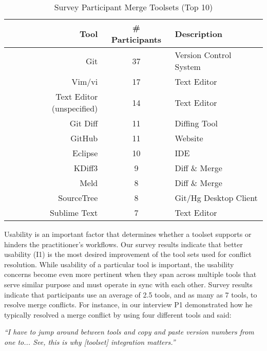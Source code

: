 \begin{table}[!htbp]
\renewcommand{\arraystretch}{1.3}
\caption{Survey Participant Merge Toolsets (Top 10)}
\label{survey_toolset}
\centering
\begin{tabularx}{0.45\textwidth}{@{}r|Cl@{}}
\toprule
Tool & \# Participants & Description\\
\midrule
Git	& 37 & Version Control System\\
Vim/vi & 17 & Text Editor\\
Text Editor (unspecified) & 14 & Text Editor\\
Git Diff & 11 & Diffing Tool\\
GitHub & 11 & Website\\
Eclipse & 10 & IDE\\
KDiff3 & 9 & Diff \& Merge\\
Meld & 8 & Diff \& Merge\\
SourceTree & 8 & Git/Hg Desktop Client\\
Sublime Text & 7 & Text Editor\\
\bottomrule
\end{tabularx}
\end{table}

Usability is an important factor that determines whether a toolset supports or hinders the practitioner's workflows.
Our survey results indicate that better usability (I1) is the most desired improvement of the tool sets used for conflict resolution. 
While usability of a particular tool is important, the usability concerns become even more pertinent when they span across multiple tools that serve similar purpose and must operate in sync with each other.
Survey results indicate that participants use an average of 2.5 tools, and as many as 7 tools, to resolve merge conflicts.
For instance, in our interview P1 demonstrated how he typically resolved a merge conflict by using four different tools and said: 
\begin{displayquote}
\textit{``I have to jump around between tools and copy and paste version numbers from one to... See, this is why [toolset] integration matters.''}
\end{displayquote}

